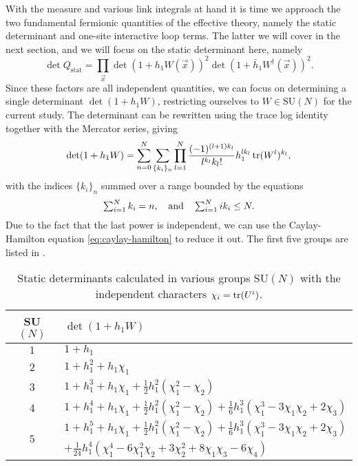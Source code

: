 With the measure and various link integrals at hand it is time we approach the
two fundamental fermionic quantities of the effective theory, namely the static
determinant and one-site interactive loop terms. The latter we will cover in the
next section, and we will focus on the static determinant here, namely
%
\begin{equation}
  \det Q_{\text{stat}} = \prod_{\vec{x}} \det ( 1 + h_1 W(\vec{x}) )^2 
    \det ( 1 + \bar{h}_1 W^{\dagger}(\vec{x}) )^2.
\end{equation}
%
Since these factors are all independent quantities, we can focus on determining
a single determinant $\det(1 + h_1 W)$, restricting ourselves to $W \in
\text{SU}(N)$ for the current study. The determinant can be rewritten using the
trace log identity together with the Mercator series, giving
%
\begin{equation}
  \det ( 1 + h_1 W ) = \sum_{n=0}^N \sum_{\{k_i\}_n} \prod_{l=1}^N
  \frac{(-1)^{(l+1)k_l}}{l^{k_l} k_l!} h_1^{l k_l} \operatorname{tr} (W^l)^{k_l},
\end{equation}
%
with the indices $\{k_i\}_n$ summed over a range bounded by the equations
%
\begin{equation} \textstyle
  \sum_{i=1}^{N} k_i = n, \hskip1em\text{and}\hskip1em
  \sum_{i=1}^N i k_i \leq N .
\end{equation}
%
Due to the fact that the last power is independent, we can use the
Caylay-Hamilton equation \eqref{eq:caylay-hamilton} to reduce it out. The first five
groups are listed in .

\begin{table}
  \begin{center}
    \begin{tabular}{cl} \toprule
      SU$(N)$ & $\det(1 + h_1 W)$ \\ \midrule
      $1$ & $1 + h_1$ \\
      $2$ & $1 + h_1^2 + h_1 \chi_1$ \\
      $3$ & $1 + h_1^3 + h_1\chi_1 + \frac{1}{2} h_1^2 (\chi_1^2 - \chi_2)$ \\
      $4$ & $1 + h_1^4 + h_1 \chi_1 + \frac{1}{2} h_1^2 (\chi_1^2 - \chi_2) +
      \frac{1}{6} h_1^3 (\chi_1^3 - 3 \chi_1 \chi_2 + 2 \chi_3)$ \\
      \multirow{2}{*}{$5$} & $1 + h_1^5 + h_1 \chi_1 + \frac{1}{2} h_1^2 (\chi_1^2 - \chi_2) +
      \frac{1}{6} h_1^3 (\chi_1^3 - 3 \chi_1 \chi_2 + 2 \chi_3) $ \\
      & $ + \frac{1}{24} h_1^4 ( \chi_1^4 - 6 \chi_1^2 \chi_2 + 3 \chi_2^2 +
      8\chi_1 \chi_3 - 6\chi_4 )$ \\ \bottomrule
    \end{tabular}
  \end{center}
  \caption{Static determinants calculated in various groups SU$(N)$ with the
    independent characters $\chi_i = \operatorname{tr}(U^i)$.}
  \label{tab:static-determinant}
\end{table}

